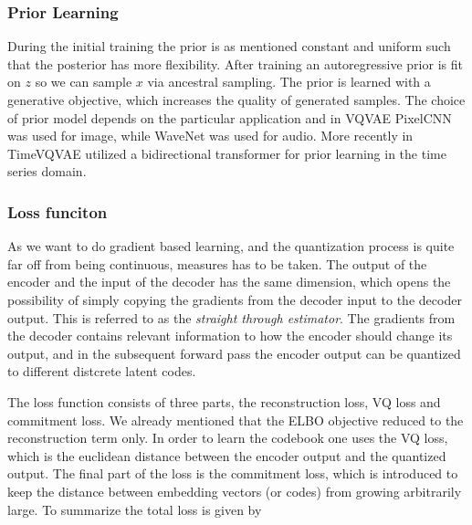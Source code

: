 \documentclass[../../thesis.tex]{subfiles}
\begin{document}


\subsubsection{Prior Learning}
During the initial training the prior is as mentioned constant and uniform such that the posterior has more flexibility. After training an autoregressive prior is fit on $z$ so we can sample $x$ via ancestral sampling. The prior is learned with a generative objective, which increases the quality of generated samples. The choice of prior model depends on the particular application and in VQVAE PixelCNN \cite{oord2016pixel} was used for image, while WaveNet \cite{oord2016wavenet} was used for audio. More recently in TimeVQVAE \cite{TimeVQVAE} utilized a bidirectional transformer \cite{chang2022maskgit} for prior learning in the time series domain. 

\subsubsection{Loss funciton}
As we want to do gradient based learning, and the quantization process is quite far off from being continuous, measures has to be taken. The output of the encoder and the input of the decoder has the same dimension, which opens the possibility of simply copying the gradients from the decoder input to the decoder output. This is referred to as the \textit{straight through estimator}. The gradients from the decoder contains relevant information to how the encoder should change its output, and in the subsequent forward pass the encoder output can be quantized to different distcrete latent codes.\newline

The loss function consists of three parts, the reconstruction loss, VQ loss and commitment loss. We already mentioned that the ELBO objective reduced to the reconstruction term only. In order to learn the codebook one uses the VQ loss, which is the euclidean distance between the encoder output and the quantized output. The final part of the loss is the commitment loss, which is introduced to keep the distance between embedding vectors (or codes) from growing arbitrarily large. To summarize the total loss is given by
\end{document}
